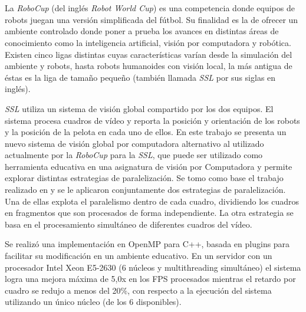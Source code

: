 \ \\
\ \\
\label{pagresum}
\\
\ \\
\ \\

\ \\

\ \\

La \emph{RoboCup} (del inglés \emph{Robot World Cup}) es una competencia donde
equipos de robots juegan una versión simplificada del fútbol. Su finalidad es
la de ofrecer un ambiente controlado donde poner a prueba los avances en
distintas áreas de conocimiento como la inteligencia artificial, visión por
computadora y robótica. Existen cinco ligas distintas cuyas características
varían desde la simulación del ambiente y robots, hasta robots humanoides con
visión local, la más antigua de éstas es la liga de tamaño pequeño (también
llamada \emph{SSL} por sus siglas en inglés).

\emph{SSL} utiliza un sistema de visión global compartido por los dos equipos.
El sistema procesa cuadros de vídeo y reporta la posición y orientación de los
robots y la posición de la pelota en cada uno de ellos. En este trabajo se
presenta un nuevo sistema de visión global por computadora alternativo al
utilizado actualmente por la \emph{RoboCup} para la \emph{SSL}, que puede ser
utilizado como herramienta educativa en una asignatura de visión por Computadora
y permite explorar distintas estrategias de paralelización. Se tomo como base el
trabajo realizado en \cite{torres2014} y se le aplicaron conjuntamente dos
estrategias de paralelización. Una de ellas explota el paralelismo dentro de
cada cuadro, dividiendo los cuadros en fragmentos que son procesados de forma
independiente. La otra estrategia se basa en el procesamiento simultáneo de
diferentes cuadros del vídeo.

Se realizó una implementación en OpenMP para C++, basada en plugins para
facilitar su modificación en un ambiente educativo. En un servidor con un
procesador Intel Xeon E5-2630 (6 núcleos y multithreading simultáneo) el
sistema logra una mejora máxima de 5,0x en los FPS procesados mientras el
retardo por cuadro se redujo a menos del 20\%, con respecto a la ejecución del
sistema utilizando un único núcleo (de los 6 disponibles).

\vfill
\pagebreak
